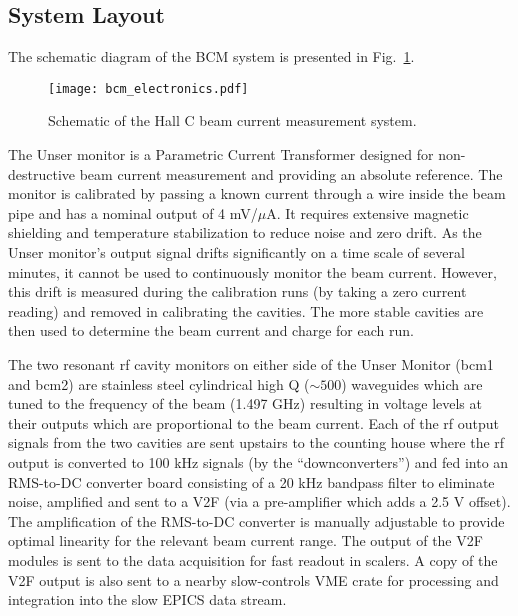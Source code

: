 {\subsection{System Layout}

The schematic diagram of the BCM system is presented in
Fig.~\ref{fig:hallc_bcm}.
\begin{figure}[h!]
\begin{center}
\texttt{[image: bcm\_electronics.pdf]}
\caption[Beam Current Measurement: Schematic]{Schematic of the Hall C beam
current measurement system.}
\label{fig:hallc_bcm}
\end{center}
\end{figure}

The Unser monitor is a Parametric Current Transformer designed for
non-destructive beam current measurement and providing an absolute
reference. The monitor is calibrated by passing a known current
through a wire inside the beam pipe and has a nominal output of 4
mV/$\mu $A. It requires extensive magnetic shielding and temperature
stabilization to reduce noise and zero drift. As the Unser monitor's
output signal drifts significantly on a time scale of several minutes,
it cannot be used to continuously monitor the beam current. However,
this drift is measured during the calibration runs (by taking a zero
current reading) and removed in calibrating the cavities.  The more
stable cavities are then used to determine the beam current and charge
for each run.

The two resonant rf cavity monitors on either side of the Unser
Monitor (bcm1 and bcm2) are stainless steel cylindrical high Q ($\sim 500$)
waveguides which are tuned to the frequency of the beam (1.497 GHz)
resulting in voltage levels at their outputs which are proportional to
the beam current. Each of the rf output signals from the two cavities
are sent upstairs to the counting house where the rf output is converted
to 100 kHz signals (by the ``downconverters'') and fed into an RMS-to-DC
converter board consisting of a 20 kHz bandpass filter to eliminate
noise, amplified and sent to a V2F (via a pre-amplifier which adds a 2.5 V offset).
The amplification of the RMS-to-DC converter is manually adjustable
to provide optimal linearity for the relevant beam current range.
The output of the V2F modules is sent to the data acquisition for fast readout
in scalers. A copy of the V2F output is also sent to a nearby slow-controls
VME crate for processing and integration into the slow EPICS data stream.

}
